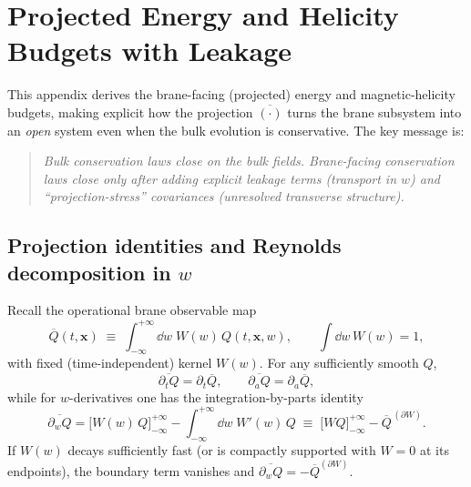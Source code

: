 \documentclass[11pt]{article}
\begin{document}
\section{Projected Energy and Helicity Budgets with Leakage}
\label{app:proj_energy_helicity}

This appendix derives the brane-facing (projected) energy and magnetic-helicity budgets,
making explicit how the projection \(\overline{(\cdot)}\) turns the brane subsystem into an
\emph{open} system even when the bulk evolution is conservative. The key message is:

\begin{quote}
\emph{Bulk conservation laws close on the bulk fields. Brane-facing conservation laws close
only after adding explicit leakage terms (transport in \(w\)) and ``projection-stress''
covariances (unresolved transverse structure).}
\end{quote}

\subsection{Projection identities and Reynolds decomposition in \texorpdfstring{\(w\)}{w}}
\label{app:proj_identities}

Recall the operational brane observable map
\begin{equation}
\overline{Q}(t,\mathbf{x})
\;\equiv\;
\int_{-\infty}^{+\infty}\dd w\;W(w)\,Q(t,\mathbf{x},w),
\qquad
\int\dd w\,W(w)=1,
\label{eq:proj_def_app}
\end{equation}
with fixed (time-independent) kernel \(W(w)\). For any sufficiently smooth \(Q\),
\begin{equation}
\overline{\partial_t Q}=\partial_t \overline{Q},
\qquad
\overline{\partial_a Q}=\partial_a \overline{Q},
\label{eq:proj_commute_tx_app}
\end{equation}
while for \(w\)-derivatives one has the integration-by-parts identity
\begin{equation}
\overline{\partial_w Q}
=
\Big[W(w)\,Q\Big]_{-\infty}^{+\infty}
-
\int_{-\infty}^{+\infty}\dd w\;W'(w)\,Q
\;\equiv\;
\Big[WQ\Big]_{-\infty}^{+\infty}
-
\overline{Q}^{\,(\partial W)}.
\label{eq:proj_parts_app}
\end{equation}
If \(W(w)\) decays sufficiently fast (or is compactly supported with \(W=0\) at its
endpoints), the boundary term vanishes and \(\overline{\partial_w Q}=-\overline{Q}^{(\partial W)}\).
\end{document}
